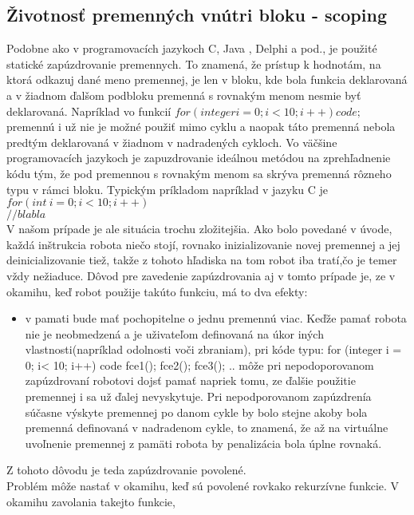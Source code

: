 \subsection{Životnosť premenných vnútri bloku - scoping}
\indent Podobne ako v programovacích jazykoch C, Java , Delphi a pod., je použité statické zapúzdrovanie premennych. To znamená, že prístup k hodnotám, na ktorá odkazuj dané meno premennej, je len v bloku, kde bola funkcia deklarovaná a v žiadnom ďalšom podbloku premenná s rovnakým menom nesmie byť deklarovaná. Napríklad vo funkcií 
$for (integer i = 0; i<10; i++)
{
	code;
}$
premennú i už nie je možné použiť mimo cyklu a naopak táto premenná nebola predtým deklarovaná v žiadnom v nadradených cykloch. Vo väčšine programovacích jazykoch je zapuzdrovanie ideálnou metódou na zprehľadnenie kódu tým, že pod premennou s rovnakým menom sa skrýva premenná rôzneho typu v rámci bloku. Typickým príkladom napríklad v jazyku C je \\$for (int\ i =0; i< 10; i++)$ \\ $ {//blabla}$ \\V našom prípade je ale situácia trochu zložitejšia. Ako bolo povedané v úvode, každá inštrukcia robota niečo stojí, rovnako inizializovanie novej premennej a jej deinicializovanie tiež, takže z tohoto hľadiska na tom robot iba tratí,čo je temer vždy nežiaduce. Dôvod pre zavedenie zapúzdrovania aj v tomto prípade je, ze v okamihu, keď robot použije takúto funkciu, má to dva efekty: \\
		\begin{itemize}
		\item v pamati bude mať pochopitelne o jednu premennú viac. Keďže pamať robota nie je neobmedzená a je uživateľom definovaná na úkor iných vlastnosti(napríklad odolnosti voči zbraniam), pri kóde typu:
for (integer i = 0; i< 10; i++)
{
	code
}
fce1();
fce2();
fce3();
..
môže pri nepodoporovanom zapúzdrovaní robotovi dojsť pamať napriek tomu, ze ďalšie použitie premennej i sa už ďalej nevyskytuje. Pri nepodporovanom zapúzdrenía súčasne výskyte premennej po danom cykle by bolo stejne akoby bola premenná definovaná v nadradenom cykle, to znamená, že až na virtuálne uvoľnenie premennej z pamäti robota by penalizácia bola úplne rovnaká.
\end{itemize}
Z tohoto dôvodu je teda zapúzdrovanie povolené. \\

Problém môže nastať v okamihu, keď sú povolené rovkako rekurzívne funkcie. V okamihu zavolania takejto funkcie, 
